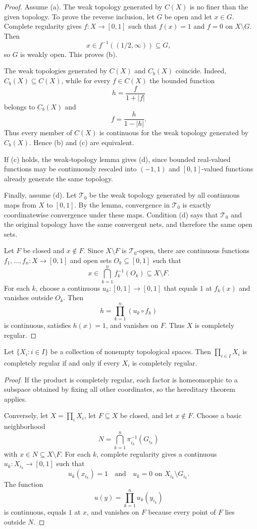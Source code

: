 \begin{proof}
Assume (a). The weak topology generated by $C(X)$ is no finer than the given
topology. To prove the reverse inclusion, let $G$ be open and let $x\in G$.
Complete regularity gives $f:X\to[0,1]$ such that $f(x)=1$ and
$f=0$ on $X\setminus G$. Then
\[
x\in f^{-1}((1/2,\infty))\subseteq G,
\]
so $G$ is weakly open. This proves (b).

The weak topologies generated by $C(X)$ and $C_b(X)$ coincide. Indeed,
$C_b(X)\subseteq C(X)$, while for every $f\in C(X)$ the bounded function
\[
h=\frac{f}{1+|f|}
\]
belongs to $C_b(X)$ and
\[
f=\frac{h}{1-|h|}.
\]
Thus every member of $C(X)$ is continuous for the weak topology generated by
$C_b(X)$. Hence (b) and (c) are equivalent.

If (c) holds, the weak-topology lemma gives (d), since bounded real-valued
functions may be continuously rescaled into $(-1,1)$ and $[0,1]$-valued
functions already generate the same topology.

Finally, assume (d). Let $\mathcal{T}_0$ be the weak topology generated by all
continuous maps from $X$ to $[0,1]$. By the lemma, convergence in
$\mathcal{T}_0$ is exactly coordinatewise convergence under these maps.
Condition (d) says that $\mathcal{T}_0$ and the original topology have the same
convergent nets, and therefore the same open sets.

Let $F$ be closed and $x\notin F$. Since $X\setminus F$ is
$\mathcal{T}_0$-open, there are continuous functions
$f_1,\ldots,f_n:X\to[0,1]$ and open sets $O_k\subseteq[0,1]$ such that
\[
x\in\bigcap_{k=1}^n f_k^{-1}(O_k)\subseteq X\setminus F.
\]
For each $k$, choose a continuous $u_k:[0,1]\to[0,1]$ that equals $1$ at
$f_k(x)$ and vanishes outside $O_k$. Then
\[
h=\prod_{k=1}^n(u_k\circ f_k)
\]
is continuous, satisfies $h(x)=1$, and vanishes on $F$. Thus $X$ is
completely regular.
\end{proof}

\begin{thm}
Let $\{X_i:i\in I\}$ be a collection of nonempty topological spaces. Then
$\prod_{i\in I}X_i$ is completely regular if and only if every $X_i$ is
completely regular.
\end{thm}

\begin{proof}
If the product is completely regular, each factor is homeomorphic to a
subspace obtained by fixing all other coordinates, so the hereditary theorem
applies.

Conversely, let $X=\prod_iX_i$, let $F\subseteq X$ be closed, and let
$x\notin F$. Choose a basic neighborhood
\[
N=\bigcap_{k=1}^n\pi_{i_k}^{-1}(G_{i_k})
\]
with $x\in N\subseteq X\setminus F$. For each $k$, complete regularity gives a
continuous $u_k:X_{i_k}\to[0,1]$ such that
\[
u_k(x_{i_k})=1
\quad\text{and}\quad
u_k=0\text{ on }X_{i_k}\setminus G_{i_k}.
\]
The function
\[
u(y)=\prod_{k=1}^n u_k(y_{i_k})
\]
is continuous, equals $1$ at $x$, and vanishes on $F$ because every point of
$F$ lies outside $N$.
\end{proof}

